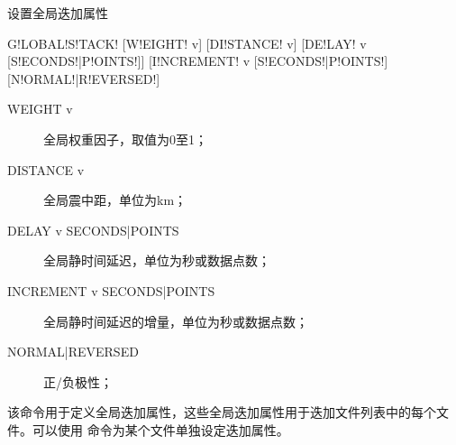 \label{sss:globalstack}

设置全局迭加属性

\begin{SACSTX}
    G!LOBAL!S!TACK! [W!EIGHT! v] [DI!STANCE! v] [DE!LAY! v [S!ECONDS!|P!OINTS!]]
        [I!NCREMENT! v [S!ECONDS!|P!OINTS!] [N!ORMAL!|R!EVERSED!]
\end{SACSTX}

\begin{description}
\item [WEIGHT v] 全局权重因子，取值为0至1；
\item [DISTANCE v] 全局震中距，单位为km；
\item [DELAY v SECONDS|POINTS] 全局静时间延迟，单位为秒或数据点数；
\item [INCREMENT v SECONDS|POINTS] 全局静时间延迟的增量，单位为秒或数据点数；
\item [NORMAL|REVERSED] 正/负极性；
\end{description}

该命令用于定义全局迭加属性，这些全局迭加属性用于迭加文件列表中的每个文件。可以使用
命令为某个文件单独设定迭加属性。



